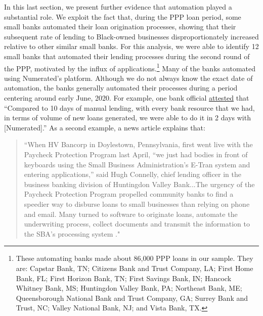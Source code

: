 \documentclass[11pt]{article}
\begin{document}
In this last section, we present further evidence that automation played a substantial role. We exploit the fact that, during the PPP loan period, some small banks automated their loan origination processes, showing that their subsequent rate of lending to Black-owned businesses disproportionately increased relative to other similar small banks. For this analysis, we were able to identify 12 small banks that automated their lending processes during the second round of the PPP, motivated by the influx of applications.\footnote{These automating banks made about 86,000 PPP loans in our sample. They are: Capstar Bank, TN; Citizens Bank and Trust Company, LA; First Home Bank, FL; First Horizon Bank, TN; First Savings Bank, IN; Hancock Whitney Bank, MS; Huntingdon Valley Bank, PA; Northeast Bank, ME; Queensborough National Bank and Trust Company, GA; Surrey Bank and Trust, NC; Valley National Bank, NJ; and Vista Bank, TX.} Many of the banks automated using Numerated's platform.  Although we do not always know the exact date of automation, the banks generally automated their processes during a period centering around early June, 2020. For example, one bank official \href{https://www.numerated.com/platform/cares-act-ppp-lending}{attested} that “Compared to 10 days of manual lending, with every bank resource that we had, in terms of volume of new loans generated, we were able to do it in 2 days with [Numerated].” As a second example, a news article explains that: 

\begin{quote}``When HV Bancorp in Doylestown, Pennsylvania, first went live with the Paycheck Protection Program last April, “we just had bodies in front of keyboards using the Small Business Administration’s E-Tran system and entering applications,” said Hugh Connelly, chief lending officer in the business banking division of Huntingdon Valley Bank...The urgency of the Paycheck Protection Program propelled community banks to find a speedier way to disburse loans to small businesses than relying on phone and email. Many turned to software to originate loans, automate the underwriting process, collect documents and transmit the information to the SBA's processing system \citep{Cross2020}."\end{quote}
\end{document}
